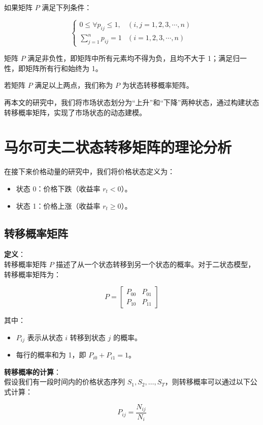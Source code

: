 \documentclass[a4paper]{article}
\begin{document}
如果矩阵 \( P \) 满足下列条件：

\[
\begin{cases}
0 \leq \forall p_{ij} \leq 1, & (i, j = 1, 2, 3, \cdots, n) \\
\sum_{j=1}^n p_{ij} = 1 & (i = 1, 2, 3, \cdots, n)
\end{cases}
\]

矩阵 \( P \) 满足非负性，即矩阵中所有元素均不得为负，且均不大于 1；满足归一性，即矩阵所有行和始终为 1。

若矩阵 \( P \) 满足以上两点，我们称为 \( P \) 为状态转移概率矩阵。\cite*{fu2023prediction}

再本文的研究中，我们将市场状态划分为“上升”和“下降”两种状态，通过构建状态转移概率矩阵，实现了市场状态的动态建模。
\section{马尔可夫二状态转移矩阵的理论分析}
在接下来价格动量的研究中，我们将价格状态定义为：
\begin{itemize}
    \item 状态 0：价格下跌（收益率 \( r_t < 0 \)）。
    \item 状态 1：价格上涨（收益率 \( r_t \geq 0 \)）。
\end{itemize}
\subsection*{转移概率矩阵}

\noindent \textbf{定义}： \\
转移概率矩阵 \( P \) 描述了从一个状态转移到另一个状态的概率。对于二状态模型，转移概率矩阵为：

\[
P = \begin{bmatrix}
P_{00} & P_{01} \\
P_{10} & P_{11}
\end{bmatrix}
\]

其中：
\begin{itemize}
    \item \( P_{ij} \) 表示从状态 \( i \) 转移到状态 \( j \) 的概率。
    \item 每行的概率和为 1，即 \( P_{i0} + P_{i1} = 1 \)。
\end{itemize}

\noindent \textbf{转移概率的计算}： \\
假设我们有一段时间内的价格状态序列 \( S_1, S_2, \dots, S_T \)，则转移概率可以通过以下公式计算：

\[
P_{ij} = \frac{N_{ij}}{N_i}
\]
\end{document}
